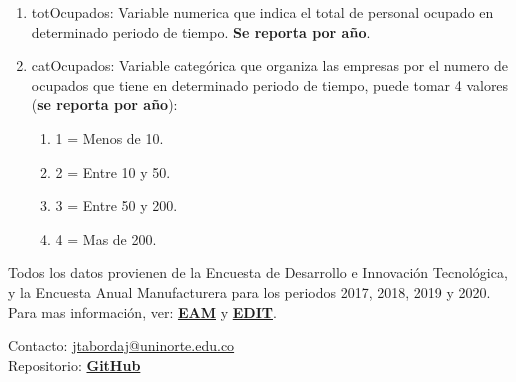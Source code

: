 \documentclass[12pt,a4paper]{article}
\begin{document}
\begin{enumerate}
	\item totOcupados: Variable numerica que indica el total de personal ocupado en determinado periodo de tiempo. \textbf{Se reporta por año}.
	\item catOcupados: Variable categórica que organiza las empresas por el numero de ocupados que tiene en determinado periodo de tiempo, puede tomar 4 valores (\textbf{se reporta por año}):
	\begin{enumerate}
		\item 1 = Menos de 10.
		\item 2 = Entre 10 y 50.
		\item 3 = Entre 50 y 200.
		\item 4 = Mas de 200.
	\end{enumerate}
\end{enumerate}

Todos los datos provienen de la Encuesta de Desarrollo e Innovación Tecnológica, y la Encuesta Anual Manufacturera para los periodos 2017, 2018, 2019 y 2020. Para mas información, ver: \textbf{\href{https://www.dane.gov.co/index.php/estadisticas-por-tema/industria/encuesta-anual-manufacturera-enam}{EAM}} y  \textbf{\href{https://www.dane.gov.co/index.php/estadisticas-por-tema/tecnologia-e-innovacion/encuesta-de-desarrollo-e-innovacion-tecnologica-edit}{EDIT}}.

\vfill

\noindent Contacto: \href{mailto:jtabordaj@uninorte.edu.co}{jtabordaj@uninorte.edu.co} \\
Repositorio: \textbf{\href{https://github.com/jtabordaj/research_perilla}{GitHub}}
\end{document}
